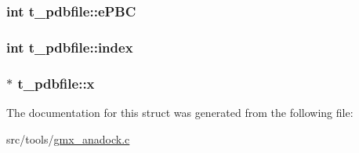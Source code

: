 \hypertarget{structt__pdbfile_a3e7fe0d986ad99f9e59dd7724545a7d8}{
\subsubsection[{e\-P\-B\-C}]{\setlength{\rightskip}{0pt plus 5cm}int {\bf t\-\_\-pdbfile\-::e\-P\-B\-C}}}\label{structt__pdbfile_a3e7fe0d986ad99f9e59dd7724545a7d8}
\hypertarget{structt__pdbfile_ad20e23a95c2ec717a8543ae1a7ec8019}{
\subsubsection[{index}]{\setlength{\rightskip}{0pt plus 5cm}int {\bf t\-\_\-pdbfile\-::index}}}\label{structt__pdbfile_ad20e23a95c2ec717a8543ae1a7ec8019}
\hypertarget{structt__pdbfile_a0a97cedf9e09ba09790f33592d976683}{
\subsubsection[{x}]{$\ast$ {\bf t\-\_\-pdbfile\-::x}}}\label{structt__pdbfile_a0a97cedf9e09ba09790f33592d976683}


\-The documentation for this struct was generated from the following file\-:\begin{DoxyCompactItemize}
\item 
src/tools/\hyperlink{gmx__anadock_8c}{gmx\-\_\-anadock.\-c}\end{DoxyCompactItemize}
